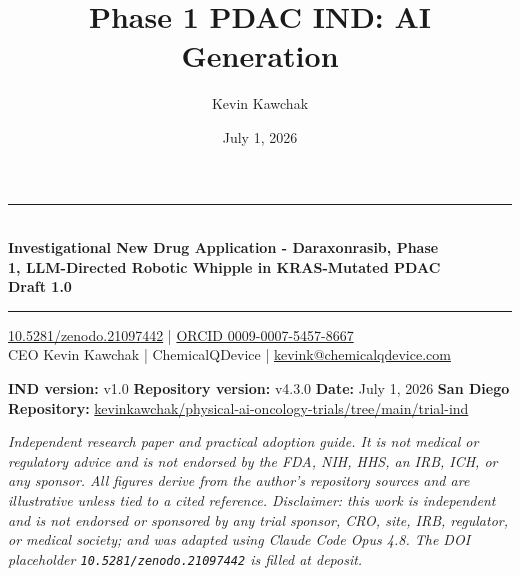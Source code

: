 \documentclass[11pt]{article}
\title{Phase 1 PDAC IND: AI Generation}
\author{Kevin Kawchak}
\date{July 1, 2026}
\begin{document}
\thispagestyle{plain}

\begin{center}
{\color{indink}\rule{\linewidth}{1.6pt}}\\[0.2em]
{\LARGE\bfseries Investigational New Drug Application - Daraxonrasib, Phase\\[0.3em] 1, LLM-Directed Robotic Whipple in KRAS-Mutated PDAC}\\[0.9em]
{\large\bfseries Draft 1.0}\\[-0.1em]
{\color{indink}\rule{\linewidth}{1.6pt}}
\end{center}

\vspace{-0.4cm}

\begin{center}\small
\href{https://doi.org/10.5281/zenodo.21097442}{10.5281/zenodo.21097442} \;|\;
\href{https://orcid.org/0009-0007-5457-8667}{ORCID 0009-0007-5457-8667} \\
CEO Kevin Kawchak \;|\; ChemicalQDevice \;|\;
\href{mailto:kevink@chemicalqdevice.com}{kevink@chemicalqdevice.com}
\end{center}

\vspace{-0.2cm}

\begin{center}\footnotesize
\textbf{IND version:} v1.0 \quad \textbf{Repository version:} v4.3.0 \quad
\textbf{Date:} July 1, 2026 \quad \textbf{San Diego}\\
\textbf{Repository:} \href{https://github.com/kevinkawchak/physical-ai-oncology-trials/tree/main/trial-ind}{kevinkawchak/physical-ai-oncology-trials/tree/main/trial-ind}
\end{center}

\vspace{-0.15cm}

\noindent\footnotesize\textit{Independent research paper and practical adoption
guide. It is not medical or regulatory advice and is not endorsed by the FDA, NIH,
HHS, an IRB, ICH, or any sponsor. All figures derive from the author's repository
sources and are illustrative unless tied to a cited reference. Disclaimer: this
work is independent and is not endorsed or sponsored by any trial sponsor, CRO,
site, IRB, regulator, or medical society; and was adapted using Claude Code Opus
4.8. The DOI placeholder \texttt{10.5281/zenodo.21097442} is filled at
deposit.}\normalsize\par
\end{document}
